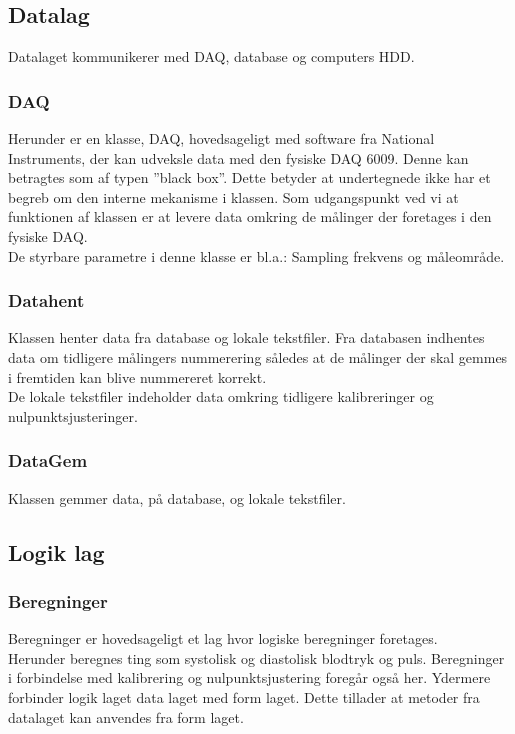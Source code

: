 \subsection{Datalag}
Datalaget kommunikerer med DAQ, database og computers HDD. 

\subsubsection{DAQ}
Herunder er en klasse, DAQ, hovedsageligt med software fra National Instruments, der kan udveksle data med den fysiske DAQ 6009. Denne kan betragtes som af typen ”black box”. Dette betyder at undertegnede ikke har et begreb om den interne mekanisme i klassen. Som udgangspunkt ved vi at funktionen af klassen er at levere data omkring de målinger der foretages i den fysiske DAQ.\\
De styrbare parametre i denne klasse er bl.a.: Sampling frekvens og måleområde. 

\subsubsection{Datahent}
Klassen henter data fra database og lokale tekstfiler. Fra databasen indhentes data om tidligere målingers nummerering således at de målinger der skal gemmes i fremtiden kan blive nummereret korrekt.\\
De lokale tekstfiler indeholder data omkring tidligere kalibreringer og nulpunktsjusteringer.

\subsubsection{DataGem}
Klassen gemmer data, på database, og lokale tekstfiler.

\subsection{Logik lag}

\subsubsection{Beregninger}
Beregninger er hovedsageligt et lag hvor logiske beregninger foretages.\\
Herunder beregnes ting som systolisk og diastolisk blodtryk og puls. Beregninger i forbindelse med kalibrering og nulpunktsjustering foregår også her. Ydermere forbinder logik laget data laget med form laget. Dette tillader at metoder fra datalaget kan anvendes fra form laget.

